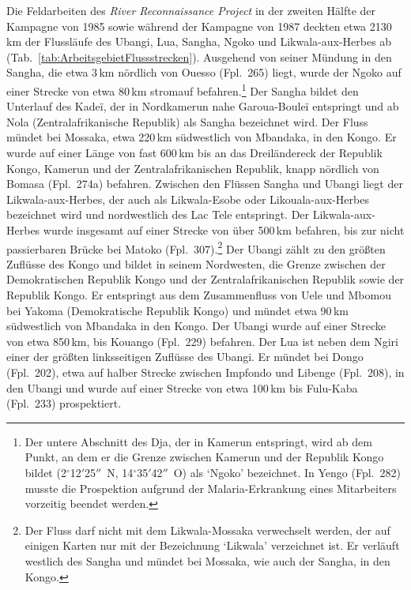 Die Feldarbeiten des \textit{River Reconnaissance Project} in der zweiten Hälfte der Kampagne von 1985 sowie während der Kampagne von 1987 deckten etwa 2130\,km der Flussläufe des Ubangi, Lua, Sangha, Ngoko und Likwala-aux-Herbes ab (Tab.~\ref{tab:ArbeitsgebietFlussstrecken}). Ausgehend von seiner Mündung in den Sangha, die etwa 3\,km nördlich von Ouesso (Fpl.~265) liegt, wurde der Ngoko auf einer Strecke von etwa 80\,km stromauf befahren.\footnote{Der untere Abschnitt des Dja, der in Kamerun entspringt, wird ab dem Punkt, an dem er die Grenze zwischen Kamerun und der Republik Kongo bildet (2$^\circ$12$'$25$''$~N, 14$^\circ$35$'$42$''$~O) als \enquote*{Ngoko} bezeichnet. In Yengo (Fpl.~282) musste die Prospektion aufgrund der Malaria-Erkrankung eines Mitarbeiters vorzeitig beendet werden.\label{ftn:DjaNgoko}} Der Sangha bildet den Unterlauf des Kadeï, der in Nordkamerun nahe Garoua-Bouleï entspringt und ab Nola (Zentralafrikanische Republik) als Sangha bezeichnet wird. Der Fluss mündet bei Mossaka, etwa 220\,km südwestlich von Mbandaka, in den Kongo. Er wurde auf einer Länge von fast 600\,km bis an das Dreiländereck der Republik Kongo, Kamerun und der Zentralafrikanischen Republik, knapp nördlich von Bomasa (Fpl.~274a) befahren. Zwischen den Flüssen Sangha und Ubangi liegt der Likwala-aux-Herbes, der auch als Likwala-Esobe oder Likouala-aux-Herbes bezeichnet wird und nordwestlich des Lac Tele entspringt. Der Likwala-aux-Herbes wurde insgesamt auf einer Strecke von über 500\,km befahren, bis zur nicht passierbaren Brücke bei Matoko (Fpl.~307).\footnote{Der Fluss darf nicht mit dem Likwala-Mossaka verwechselt werden, der auf einigen Karten nur mit der Bezeichnung \enquote*{Likwala} verzeichnet ist. Er verläuft westlich des Sangha und mündet bei Mossaka, wie auch der Sangha, in den Kongo.} Der Ubangi zählt zu den größten Zuflüsse des Kongo und bildet in seinem Nordwesten, die Grenze zwischen der Demokratischen Republik Kongo und der Zentralafrikanischen Republik sowie der Republik Kongo. Er entspringt aus dem Zusammenfluss von Uele und Mbomou bei Yakoma (Demokratische Republik Kongo) und mündet etwa 90\,km südwestlich von Mbandaka in den Kongo. Der Ubangi wurde auf einer Strecke von etwa 850\,km, bis Kouango (Fpl.~229) befahren. Der Lua ist neben dem Ngiri einer der größten linksseitigen Zuflüsse des Ubangi. Er mündet bei Dongo (Fpl.~202), etwa auf halber Strecke zwischen Impfondo und Libenge (Fpl.~208), in den Ubangi und wurde auf einer Strecke von etwa 100\,km bis Fulu-Kaba (Fpl.~233) prospektiert.

